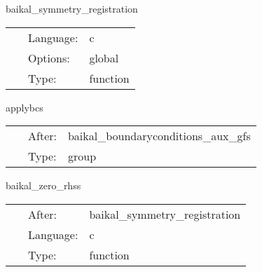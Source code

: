 \vspace{5mm}


\hspace{5mm} baikal\_symmetry\_registration 

\hspace{5mm}{\it register symmetries, the cartgrid3d way. } 


\hspace{5mm}

 \begin{tabular*}{160mm}{cll} 
~ & Language:  & c \\ 
~ & Options:  & global \\ 
~ & Type:  & function \\ 
\end{tabular*} 


\vspace{5mm}


\hspace{5mm} applybcs 

\hspace{5mm}{\it apply boundary conditions } 


\hspace{5mm}

 \begin{tabular*}{160mm}{cll} 
~ & After:  & baikal\_boundaryconditions\_aux\_gfs \\ 
~ & Type:  & group \\ 
\end{tabular*} 


\vspace{5mm}


\hspace{5mm} baikal\_zero\_rhss 

\hspace{5mm}{\it idea from lean: set all rhs functions to zero to prevent spurious nans } 


\hspace{5mm}

 \begin{tabular*}{160mm}{cll} 
~ & After:  & baikal\_symmetry\_registration \\ 
~ & Language:  & c \\ 
~ & Type:  & function \\ 
\end{tabular*} 


